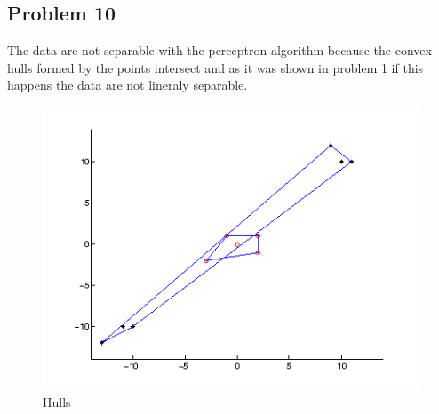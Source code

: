\newpage
\subsection*{Problem 10}
The data are not separable with the perceptron algorithm because the convex
hulls formed by the points intersect and as it was shown in problem 1 if this 
happens the data are not lineraly separable.
\begin{figure}
\centering{}\includegraphics[width=1\textwidth]{plots/10_hull}\caption{Hulls}
\end{figure}

\newpage
